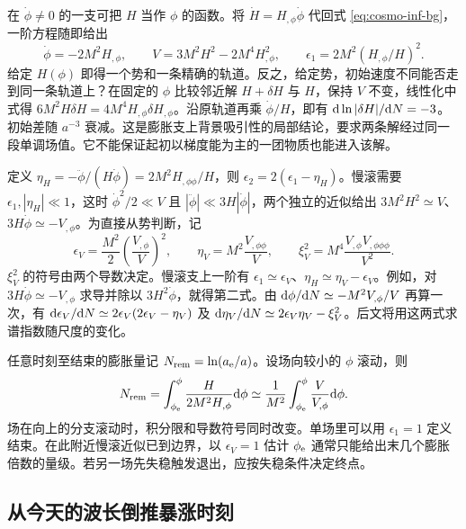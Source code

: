 在 $\dot\phi\ne0$ 的一支可把 $H$ 当作 $\phi$ 的函数。将 $\dot H=H_{,\phi}\dot\phi$ 代回式 \eqref{eq:cosmo-inf-bg}，一阶方程随即给出
\begin{equation}\label{eq:cosmo-inf-HJ}
 \dot\phi=-2M^2H_{,\phi},\qquad
 V=3M^2H^2-2M^4H_{,\phi}^2,\qquad
 \epsilon_1=2M^2(H_{,\phi}/H)^2 .
\end{equation}
给定 $H(\phi)$ 即得一个势和一条精确的轨道。反之，给定势，初始速度不同能否走到同一条轨道上？在固定的 $\phi$ 比较邻近解 $H+\delta H$ 与 $H$，保持 $V$ 不变，线性化中式得 $6M^2H\delta H=4M^4H_{,\phi}\delta H_{,\phi}$。沿原轨道再乘 $\dot\phi/H$，即有 $\dd\ln|\delta H|/\dd N=-3$。初始差随 $a^{-3}$ 衰减。这是膨胀支上背景吸引性的局部结论，要求两条解经过同一段单调场值。它不能保证起初以梯度能为主的一团物质也能进入该解。

定义 $\eta_H=-\ddot\phi/(H\dot\phi)=2M^2H_{,\phi\phi}/H$，则 $\epsilon_2=2(\epsilon_1-\eta_H)$。慢滚需要 $\epsilon_1,|\eta_H|\ll1$，这时 $\dot\phi^2/2\ll V$ 且 $|\ddot\phi|\ll3H|\dot\phi|$，两个独立的近似给出 $3M^2H^2\simeq V$、$3H\dot\phi\simeq-V_{,\phi}$。为直接从势判断，记
\begin{equation}\label{eq:cosmo-inf-srv}
 \epsilon_V=\frac{M^2}{2}\left(\frac{V_{,\phi}}V\right)^2,\qquad
 \eta_V=M^2\frac{V_{,\phi\phi}}V,\qquad
 \xi_V^2=M^4\frac{V_{,\phi}V_{,\phi\phi\phi}}{V^2}.
\end{equation}
$\xi_V^2$ 的符号由两个导数决定。慢滚支上一阶有 $\epsilon_1\simeq\epsilon_V$、$\eta_H\simeq\eta_V-\epsilon_V$。例如，对 $3H\dot\phi\simeq-V_{,\phi}$ 求导并除以 $3H^2\dot\phi$，就得第二式。由 $\dd\phi/\dd N\simeq-M^2V_{,\phi}/V$ 再算一次，有 $\dd\epsilon_V/\dd N\simeq2\epsilon_V(2\epsilon_V-\eta_V)$ 及 $\dd\eta_V/\dd N\simeq2\epsilon_V\eta_V-\xi_V^2$。后文将用这两式求谱指数随尺度的变化。

任意时刻至结束的膨胀量记 $N_{\rm rem}=\ln(a_{\rm e}/a)$。设场向较小的 $\phi$ 滚动，则
\begin{equation}\label{eq:cosmo-inf-efolds}
 N_{\rm rem}=\int_{\phi_{\rm e}}^{\phi}
 \frac{H}{2M^2 H_{,\phi}}\dd\phi
 \simeq\frac1{M^2}\int_{\phi_{\rm e}}^{\phi}\frac{V}{V_{,\phi}}\dd\phi .
\end{equation}
场在向上的分支滚动时，积分限和导数符号同时改变。单场里可以用 $\epsilon_1=1$ 定义结束。在此附近慢滚近似已到边界，以 $\epsilon_V=1$ 估计 $\phi_{\rm e}$ 通常只能给出末几个膨胀倍数的量级。若另一场先失稳触发退出，应按失稳条件决定终点。

\subsection{从今天的波长倒推暴涨时刻}\label{sec:cosmo-inf-matching}

